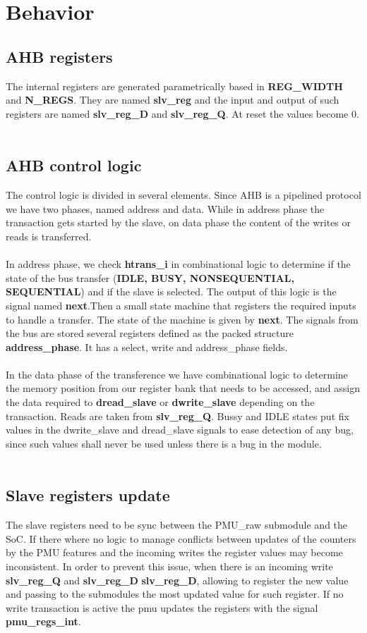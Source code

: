 \section{Behavior}\label{behavior}

\subsection{ AHB registers}
The internal registers are generated parametrically based in \textbf{REG\_WIDTH} and \textbf{N\_REGS}. They are named \textbf{slv\_reg} and the input and output of such registers are named \textbf{slv\_reg\_D} and \textbf{slv\_reg\_Q}. At reset the values become 0.\\
\\
\subsection{AHB control logic}
The control logic is divided in several elements. Since  AHB is a pipelined protocol we have two phases, named address and data. While in address phase the transaction gets started by the slave, on data phase the content of the writes or reads is transferred.\\
\\
In address phase, we check \textbf{htrans\_i} in combinational logic to determine if the state of the bus transfer (\textbf{IDLE, BUSY, NONSEQUENTIAL, SEQUENTIAL}) and if the slave is selected. The output of this logic is the signal named \textbf{next}.Then a small state machine that registers the required inputs to handle a transfer. The state of the machine is given by \textbf{next}. The  signals from the bus are stored several registers defined as the packed structure \textbf{address\_phase}. It has a select,  write and address\_phase fields.\\
\\
In the data phase of the transference we have combinational logic to determine the memory position from our register bank that needs to be accessed, and assign the data required to \textbf{dread\_slave} or \textbf{dwrite\_slave} depending on the transaction. Reads are taken  from \textbf{slv\_reg\_Q}. Bussy and IDLE states put fix values in the dwrite\_slave and dread\_slave signals to ease detection of any bug, since such values shall never be used unless there is a bug in the module.\\
\\
\subsection{Slave registers update}
The slave registers need to be sync between the PMU\_raw submodule and the SoC. If there where no logic to manage conflicts between updates of the counters by the PMU features and the incoming writes the register values may become inconsistent. In order to prevent this issue, when there is an incoming write \textbf{slv\_reg\_Q} and \textbf{slv\_reg\_D} \textbf{slv\_reg\_D}, allowing to register the new value and passing to the submodules the most updated value for such register. If no write transaction is active the pmu updates the registers with the signal \textbf{pmu\_regs\_int}.

